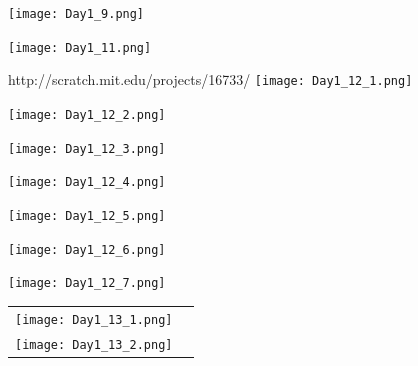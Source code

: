 \documentclass[11pt]{article}
\begin{document}
\newpage
\begin{center}
\texttt{[image: Day1\_9.png]}\\
\end{center}

\newpage
\begin{center}
\texttt{[image: Day1\_11.png]}\\
\end{center}

\newpage
\begin{center}
{\Large http://scratch.mit.edu/projects/16733/}
\texttt{[image: Day1\_12\_1.png]}\\
\end{center}

\newpage
\begin{center}
\texttt{[image: Day1\_12\_2.png]}\\
\end{center}

\newpage
\begin{center}
\texttt{[image: Day1\_12\_3.png]}\\
\end{center}

\newpage
\begin{center}
\texttt{[image: Day1\_12\_4.png]}\\
\end{center}

\newpage
\begin{center}
\texttt{[image: Day1\_12\_5.png]}\\
\end{center}

\newpage
\begin{center}
\texttt{[image: Day1\_12\_6.png]}\\
\end{center}

\newpage
\begin{center}
\texttt{[image: Day1\_12\_7.png]}\\
\end{center}

\newpage
\begin{table}[htdp]
\begin{center}
\begin{tabular}{cc}
\texttt{[image: Day1\_13\_1.png]}\\
\texttt{[image: Day1\_13\_2.png]}\\
\end{tabular}
\end{center}
\end{table}%
\end{document}
